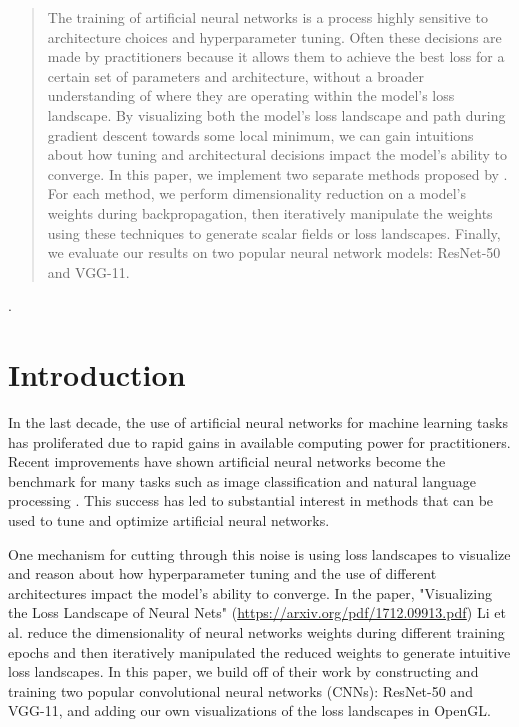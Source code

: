 \documentclass{acmsiggraph}
\begin{document}
\begin{abstract}

	\copyrightspace
    The training of artificial neural networks is a process highly sensitive to architecture choices and hyperparameter tuning. Often these decisions are made by practitioners because it allows them to achieve the best loss for a certain set of parameters and architecture, without a broader understanding of where they are operating within the model's loss landscape. By visualizing both the model's loss landscape and path during gradient descent towards some local minimum, we can gain intuitions about how tuning and architectural decisions impact the model's ability to converge. In this paper, we implement two separate methods proposed by \cite{NEURIPS2018_a41b3bb3}. For each method, we perform dimensionality reduction on a model's weights during backpropagation, then iteratively manipulate the weights using these techniques to generate scalar fields or loss landscapes. Finally, we evaluate our results on two popular neural network models: ResNet-50 and VGG-11.
	
\end{abstract}

\keywordlist.

\section{Introduction}
\label{sec:intro}

In the last decade, the use of artificial neural networks for machine learning tasks has proliferated due to rapid gains in available computing power for practitioners. Recent improvements have shown artificial neural networks become the benchmark for many tasks such as image classification and natural language processing \cite{ABIODUN2018e00938}. This success has led to substantial interest in methods that can be used to tune and optimize artificial neural networks. 

One mechanism for cutting through this noise is using loss landscapes to visualize and reason about how hyperparameter tuning and the use of different architectures impact the model's ability to converge. In the paper, "Visualizing the Loss Landscape of Neural Nets" (\url{https://arxiv.org/pdf/1712.09913.pdf}) Li et al. reduce the dimensionality of neural networks weights during different training epochs and then iteratively manipulated the reduced weights to generate intuitive loss landscapes. In this paper, we build off of their work by constructing and training two popular convolutional neural networks (CNNs): ResNet-50 and VGG-11, and adding our own visualizations of the loss landscapes in OpenGL.
\end{document}
